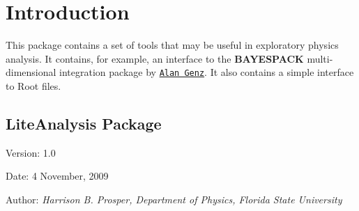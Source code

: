 \hypertarget{main_intro}{}\section{Introduction}\label{main_intro}
This package contains a set of tools that may be useful in exploratory physics analysis. It contains, for example, an interface to the {\bf BAYESPACK} multi-dimensional integration package by \href{http://www.sci.wsu.edu/math/faculty/genz/homepage}{\tt Alan Genz}. It also contains a simple interface to Root files.\hypertarget{main_pages}{}\subsection{Lite\-Analysis Package}\label{main_pages}
\begin{Desc}
\item[Version:]1.0 \end{Desc}
\begin{Desc}
\item[Date:]4 November, 2009 \end{Desc}
\begin{Desc}
\item[Author:]{\em Harrison B. Prosper, Department of Physics, Florida State University\/} \end{Desc}
